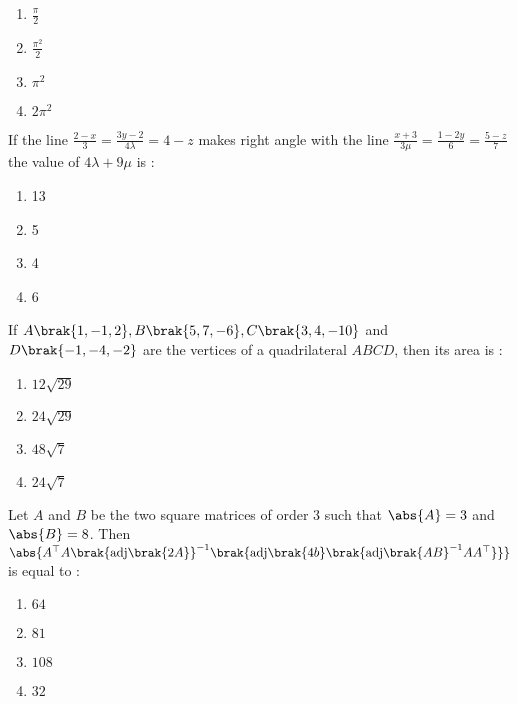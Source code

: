 	\begin{multicols}{4}
		\begin{enumerate}
            \item $\frac{\pi}{2}$ \columnbreak
            \item $\frac{\pi ^ 2}{2}$ \columnbreak
            \item $\pi ^ 2$ \columnbreak
			\item $2\pi ^2 $
		\end{enumerate}
	\end{multicols}
\item If the line $\frac{2-x}{3} = \frac{3y-2}{4\lambda} = 4-z$ makes right angle with 
    the line $\frac{x+3}{3\mu} = \frac{1-2y}{6} = \frac{5-z}{7}$ the value of $4\lambda + 9\mu$ is :
		\hfill{}
		\begin{multicols}{4}
		\begin{enumerate}
			\item 13 \columnbreak
			\item 5 \columnbreak 
			\item 4 \columnbreak
			\item 6
		\end{enumerate}
        \end{multicols}
    \item If $A\brak{1, -1, 2}, B\brak{5, 7, -6}, C\brak{3, 4, -10}$ and $D\brak{-1, -4, -2}$ 
        are the vertices of a quadrilateral $ABCD$, then its area is :
		\hfill{\brak{2024-Apr}}
	\begin{multicols}{4}
		\begin{enumerate}
            \item $12\sqrt{29}$ \columnbreak
            \item $24\sqrt{29}$ \columnbreak
            \item $48\sqrt{7}$ \columnbreak
            \item $24\sqrt{7}$
		\end{enumerate}
	\end{multicols}
\item Let $A$ and $B$ be the two square matrices of order 3 such that $\abs{A} = 3$ 
    and $\abs{B} = 8$. Then\\ 
    $\abs{A^{\top}A\brak{\textnormal{adj}\brak{2A}}^{-1}\brak{\textnormal{adj}\brak{4b}\brak{\textnormal{adj}\brak{AB}^{-1}AA^{\top}}}}$
    is equal to :
		\hfill{}
	\begin{multicols}{4}
		\begin{enumerate}
            \item $64$ \columnbreak
            \item $81$ \columnbreak
            \item $108$ \columnbreak
            \item $32$
		\end{enumerate}
	\end{multicols}
